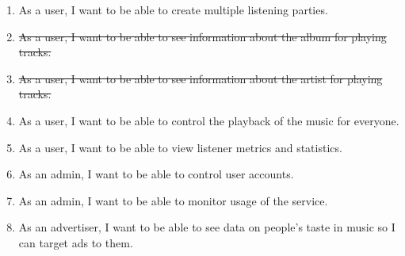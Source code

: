 \documentclass[11pt]{report}
\begin{document}
\begin{enumerate}
    \item As a user, I want to be able to create multiple listening parties.
    
    \item \st{As a user, I want to be able to see information about the album for playing tracks.}
    
    \item \st{As a user, I want to be able to see information about the artist for playing tracks.}

    \item As a user, I want to be able to control the playback of the music for everyone.
    
    \item As a user, I want to be able to view listener metrics and statistics.
    
    \item As an admin, I want to be able to control user accounts.
    
    \item As an admin, I want to be able to monitor usage of the service.
    
    \item As an advertiser, I want to be able to see data on people's taste in music so I can target ads to them.

\end{enumerate}
\end{document}
